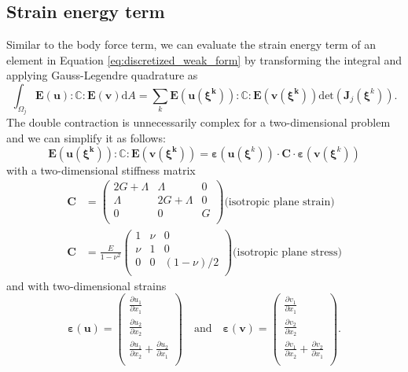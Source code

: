 \subsection{Strain energy term}
Similar to the body force term, we can evaluate the strain energy term of an element in Equation \eqref{eq:discretized_weak_form} by transforming the integral and applying Gauss-Legendre quadrature as 
\begin{equation}
    \int_{\Omega_j} \mathbf{E}(\mathbf{u}) : \mathbb{C} :  \mathbf{E}(\mathbf{v}) \text{d}A 
    = \sum_k \mathbf{E}\left(\mathbf{u}(\pmb{\xi^k})\right) : \mathbb{C} :  \mathbf{E}\left(\mathbf{v}(\pmb{\xi^k})\right)  \text{det}\left(\mathbf{J}_j(\pmb{\xi}^k)\right).
\end{equation}
The double contraction is unnecessarily complex for a two-dimensional problem and we can simplify it as follows:
\begin{equation}
    \mathbf{E}\left(\mathbf{u}(\pmb{\xi^k})\right) : \mathbb{C} :  \mathbf{E}\left(\mathbf{v}(\pmb{\xi^k})\right) = 
    \pmb{\varepsilon}\left(\mathbf{u}(\pmb{\xi}^k)\right)
    \cdot 
    \mathbf{C}
    \cdot 
    \pmb{\varepsilon}\left(\mathbf{v}(\pmb{\xi}^k)\right)
\end{equation}
with a two-dimensional stiffness matrix
\begin{align}
        \mathbf{C} &= \begin{pmatrix}
        2G+\Lambda & \Lambda & 0 \\
        \Lambda & 2G+\Lambda &  0 \\
        0 & 0 & G \\
    \end{pmatrix} \textrm{(isotropic plane strain)}\\
    \mathbf{C} &= \frac{E}{1-\nu^2}\begin{pmatrix}
        1 & \nu & 0 \\
        \nu & 1 &  0 \\
        0 & 0 & (1-\nu)/2 \\
    \end{pmatrix} \textrm{(isotropic plane stress)}
\end{align}
and with two-dimensional strains
\begin{equation}
    \pmb{\varepsilon}(\mathbf{u}) = 
    \begin{pmatrix}
        \frac{\partial u_1}{\partial x_1} \\ 
        \frac{\partial u_2}{\partial x_2} \\
        \frac{\partial u_1}{\partial x_2} + \frac{\partial u_2}{\partial x_1}\\
    \end{pmatrix}
    \quad 
    \textrm{and}
    \quad
    \pmb{\varepsilon}(\mathbf{v}) = 
    \begin{pmatrix}
        \frac{\partial v_1}{\partial x_1} \\ 
        \frac{\partial v_2}{\partial x_2} \\
        \frac{\partial v_1}{\partial x_2} + \frac{\partial v_2}{\partial x_1}\\
    \end{pmatrix}.
\end{equation}
